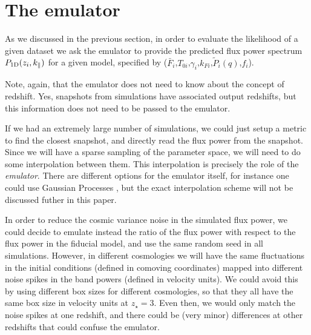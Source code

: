 \section{The emulator} \label{sec:emu}

As we discussed in the previous section, in order to evaluate the
likelihood of a given dataset we ask the emulator to provide the predicted
flux power spectrum $P_{\rm 1D}(z_i,k_\parallel)$ for a given model,
specified by ($\bar F_i$,$T_{0i}$,$\gamma_i$,$k_{Fi}$,$\tilde P_i(q)$,$f_i$).

Note, again, that the emulator does not need to know about the concept of
redshift.
Yes, snapshots from simulations have associated output redshifts, but this
information does not need to be passed to the emulator.


If we had an extremely large number of simulations, we could just setup a
metric to find the closest snapshot, and directly read the flux power
from the snapshot.
Since we will have a sparse sampling of the parameter space, we will need
to do some interpolation between them. 
This interpolation is precisely the role of the \textit{emulator}.
There are different options for the emulator itself, for instance one could
use Gaussian Processes \cite{Heitmann2009,Heitmann2014,SLAC2018,
Walther2018a,Bird2018,Rogers2018c}, but the exact interpolation scheme will
not be discussed futher in this paper.

In order to reduce the cosmic variance noise in the simulated flux power,
we could decide to emulate instead the ratio of the flux power with respect
to the flux power in the fiducial model, and use the same random seed in all
simulations.
However, in different cosmologies we will have the same fluctuations in the
initial conditions (defined in comoving coordinates) mapped into different 
noise spikes in the band powers (defined in velocity units).
We could avoid this by using different box sizes for different cosmologies,
so that they all have the same box size in velocity units at $z_\star=3$.
Even then, we would only match the noise spikes at one redshift, and there
could be (very minor) differences at other redshifts that could confuse
the emulator.

